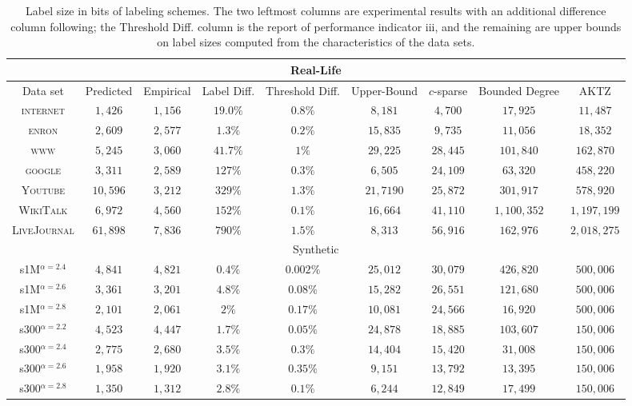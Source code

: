 \begin{table}
\small
\begin{tabular}{ccccccccc}
\hline \multicolumn{9}{c}{Real-Life}\\\hline
Data set&Predicted &Empirical & Label Diff. & Threshold Diff.   & Upper-Bound     &$c$-sparse &Bounded Degree \cite{adjiashvili2014labeling} &AKTZ \cite{alstrup2014adjacency}\\\hline
\textsc{internet}   &$1,426$    &$1,156$  & $19.0\%$  & $0.8\%$  & $8,181 $  &$4,700$      &$17,925$  &$11,487$\\
\textsc{enron}      &$2,609$    &$2,577$  & $1.3\%$ & $0.2\%$   & $15,835 $ &$9,735$      &$11,056$  &$18,352$\\
\textsc{www}        &$5,245$    &$3,060$  & $41.7\%$  & $1\%$  & $29,225 $ &$28,445$     &$101,840$ &$162,870$ \\
\textsc{google} & $3,311$ & $2,589$ & $127\%$ & $0.3\%$ & $6,505$ & $24,109$ & $63,320$ & $458,220$\\
\textsc{Youtube}        &$10,596$    &$3,212$  & $329\%$  & $1.3\%$  & $21,7190$ &$25,872$     &$301,917$ &$578,920$ \\
\textsc{WikiTalk}       & $6,972$ & $4,560$ & $152\%$ & $0.1\%$ & $16,664$ & $41,110$ & $1,100,352$ & $1,197,199$\\ 
\textsc{LiveJournal}        &$61,898$    &$7,836$  & $790\%$  & $1.5\%$  & $8,313$ &$56,916$     &$162,976$ &$2,018,275$ \\\hline
\multicolumn{9}{c}{Synthetic}\\\hline
s1M$^{\alpha=2.4}$  &$4,841$    &$4,821$  & $0.4\%$ & $0.002\%$  & $25,012 $ &$30,079$     &$426,820$ &$500,006$\\
s1M$^{\alpha=2.6}$  &$3,361$    &$3,201$   & $4.8\%$ & $0.08\%$  & $15,282 $ &$26,551$     &$121,680$ &$500,006$\\
s1M$^{\alpha=2.8}$  &$2,101$    &$2,061$    & $2\%$ & $0.17\%$  & $10,081 $ &$24,566$     &$16,920$  &$500,006$\\
s300$^{\alpha=2.2}$ &$4,523$    &$4,447$  & $1.7\%$ & $0.05\%$  & $24,878 $ &$18,885$     &$103,607$ &$150,006$\\
s300$^{\alpha=2.4}$ &$2,775$    &$2,680$   & $3.5\%$  & $0.3\%$ & $14,404 $ &$15,420$     &$31,008$  &$150,006$\\
s300$^{\alpha=2.6}$ &$1,958$    &$1,920$  & $3.1\%$ & $0.35\%$   & $9,151 $  &$13,792$     &$13,395$  &$150,006$\\
s300$^{\alpha=2.8}$ &$1,350$    &$1,312$  & $2.8\%$ & $0.1\%$   & $6,244 $  &$12,849$     &$17,499$  &$150,006$\\\hline
\end{tabular}
\caption{Label size in bits of labeling schemes. The two leftmost columns are experimental results with an additional difference column following; the Threshold Diff. column is the report of performance indicator iii, and the remaining are upper bounds on label sizes computed from the characteristics of the data sets.}
\label{t:labelsizes}
\end{table}

